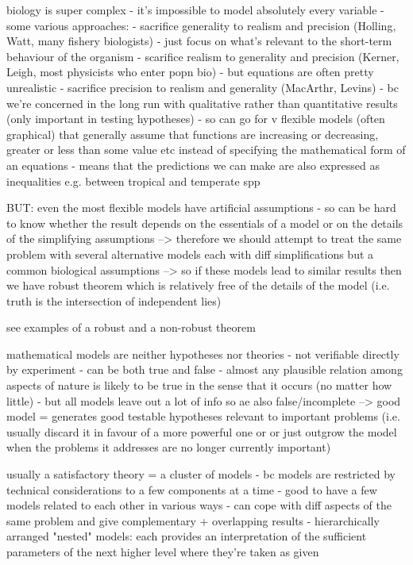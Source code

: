 \documentclass[11pt]{article}
\begin{document}
	biology is super complex - it's impossible to model absolutely every variable
	- some various approaches:
	- sacrifice generality to realism and precision (Holling, Watt, many fishery biologists)
	- just focus on what's relevant to the short-term behaviour of the organism
	- scarifice realism to generality and precision (Kerner, Leigh, most physicists who enter popn bio)
	- but equations are often pretty unrealistic
	- sacrifice precision to realism and generality (MacArthr, Levins)
	- bc we're concerned in the long run with qualitative rather than quantitative results (only important in testing hypotheses)
	- so can go for v flexible models (often graphical) that generally assume that functions are increasing or decreasing, greater or less than some value etc instead of specifying the mathematical form of an equations
	- means that the predictions we can make are also expressed as inequalities e.g. between tropical and temperate spp
	
	BUT: even the most flexible models have artificial assumptions
	- so can be hard to know whether the result depends on the essentials of a model or on the details of the simplifying assumptions
	--> therefore we should attempt to treat the same problem with several alternative models each with diff simplifications but a common biological assumptions
	--> so if these models lead to similar results then we have robust theorem which is relatively free of the details of the model
	(i.e. truth is the intersection of independent lies)
	
	see examples of a robust and a non-robust theorem
	
	mathematical models are neither hypotheses nor theories
	- not verifiable directly by experiment
	- can be both true and false
	- almost any plausible relation among aspects of nature is likely to be true in the sense that it occurs (no matter how little)
	- but all models leave out a lot of info so ae also false/incomplete
	--> good model = generates good testable hypotheses relevant to important problems
	(i.e. usually discard it in favour of a more powerful one or or just outgrow the model when the problems it addresses are no longer currently important)
	
	usually a satisfactory theory = a cluster of models
	- bc models are restricted by technical considerations to a few components at a time
	- good to have a few models related to each other in various ways 
	- can cope with diff aspects of the same problem and give complementary + overlapping results
	- hierarchically arranged "nested" models: each provides an interpretation of the sufficient parameters of the next higher level where they're taken as given
	
\end{document}
